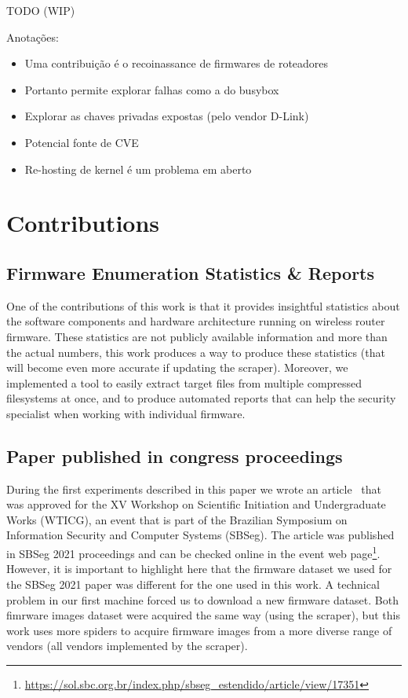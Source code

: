 TODO (WIP)

Anotações:
\begin{itemize}

    \item Uma contribuição é o recoinassance de firmwares de roteadores
    \item Portanto permite explorar falhas como a do busybox
    \item Explorar as chaves privadas expostas (pelo vendor D-Link)
    \item Potencial fonte de CVE
    \item Re-hosting de kernel é um problema em aberto
    
\end{itemize}

\section{Contributions}

\subsection{Firmware Enumeration Statistics \& Reports}
One of the contributions of this work is that it provides insightful statistics about the software components and hardware architecture running on wireless router firmware. These statistics are not publicly available information and more than the actual numbers, this work produces a way to produce these statistics (that will become even more accurate if updating the scraper). Moreover, we implemented a tool to easily extract target files from multiple compressed filesystems at once, and to produce automated reports that can help the security specialist when working with individual firmware.

\subsection{Paper published in congress proceedings}
During the first experiments described in this paper we wrote an article~\cite{sbseg2021} that was approved for the XV Workshop on Scientific Initiation and Undergraduate Works (WTICG), an event that is part of the Brazilian Symposium on Information Security and Computer Systems (SBSeg). The article was published in SBSeg 2021 proceedings and can be checked online in the event web page\footnote{\url{https://sol.sbc.org.br/index.php/sbseg_estendido/article/view/17351}}. However, it is important to highlight here that the firmware dataset we used for the SBSeg 2021 paper was different for the one used in this work. A technical problem in our first machine forced us to download a new firmware dataset. Both fimrware images dataset were acquired the same way (using the scraper), but this work uses more spiders to acquire firmware images from a more diverse range of vendors (all vendors implemented by the scraper).

